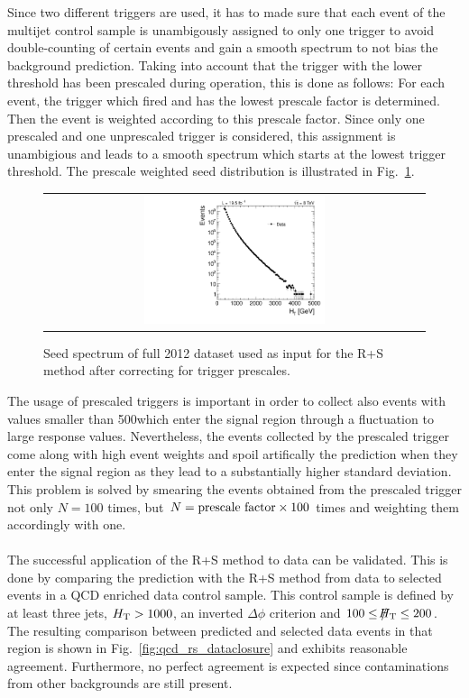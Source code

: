 Since two different triggers are used, it has to made sure that each event of the multijet control sample is unambigously assigned to only one trigger to avoid double-counting of certain events and gain a smooth \HT spectrum to not bias the background prediction. Taking into account that the trigger with the lower \HT threshold has been prescaled during operation, this is done as follows: For each event, the trigger which fired and has the lowest prescale factor is determined. Then the event is weighted according to this prescale factor. Since only one prescaled and one unprescaled trigger is considered, this assignment is unambigious and leads to a smooth \HT spectrum which starts at the lowest trigger threshold. The prescale weighted seed \HT distribution is illustrated in Fig.~\ref{fig:qcd_rs_seedht}.
\begin{figure}[!t]
  \centering
  \begin{tabular}{c}
                \includegraphics[width=0.49\textwidth]{figures/HT_data.pdf}
  \end{tabular}
  \caption{Seed \HT spectrum of full 2012 dataset used as input for the R+S method after correcting for trigger prescales.}
  \label{fig:qcd_rs_seedht}
\end{figure}
The usage of prescaled triggers is important in order to collect also events with \HT values smaller than 500\gev which enter the signal region through a fluctuation to large response values. Nevertheless, the events collected by the prescaled trigger come along with high event weights and spoil artifically the prediction when they enter the signal region as they lead to a substantially higher standard deviation. This problem is solved by smearing the events obtained from the prescaled trigger not only $N = 100$ times, but $N = \rm{prescale~factor} \times 100$ times and weighting them accordingly with one.\\
\\
The successful application of the R+S method to data can be validated. This is done by comparing the prediction with the R+S method from data to selected events in a QCD enriched data control sample. This control sample is defined by at least three jets, $H_{\text{T}} > 1000$\gev, an inverted $\Delta \phi$ criterion and $100 \leq \slash\mkern-12mu{H}_{\text{T}} \leq 200$\gev. The resulting comparison between predicted and selected data events in that region is shown in Fig.~\ref{fig:qcd_rs_dataclosure} and exhibits reasonable agreement. Furthermore, no perfect agreement is expected since contaminations from other backgrounds are still present. \\
